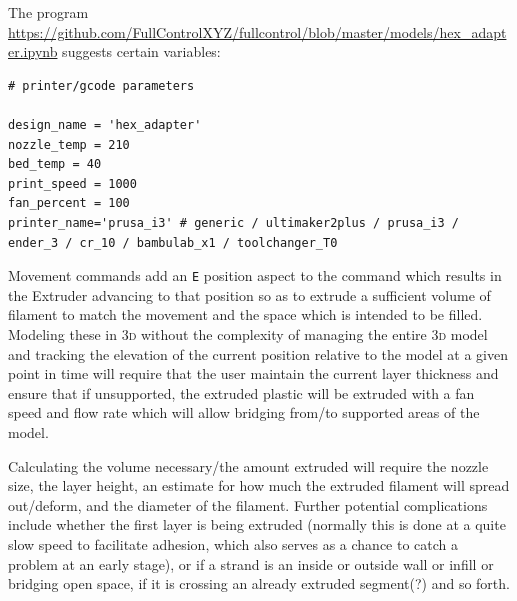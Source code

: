 \documentclass{ltxdoc}
\begin{document}
The program \url{https://github.com/FullControlXYZ/fullcontrol/blob/master/models/hex_adapter.ipynb} suggests certain variables:

\begin{verbatim}
# printer/gcode parameters

design_name = 'hex_adapter'
nozzle_temp = 210
bed_temp = 40
print_speed = 1000
fan_percent = 100
printer_name='prusa_i3' # generic / ultimaker2plus / prusa_i3 / ender_3 / cr_10 / bambulab_x1 / toolchanger_T0
\end{verbatim}

Movement commands add an \verb|E| position aspect to the command which results in the Extruder advancing to that position so as to extrude a sufficient volume of filament to match the movement and the space which is intended to be filled. Modeling these in \textsc{3d} without the complexity of managing the entire \textsc{3d} model and tracking the elevation of the current position relative to the model at a given point in time will require that the user maintain the current layer thickness and ensure that if unsupported, the extruded plastic will be extruded with a fan speed and flow rate which will allow bridging from/to supported areas of the model.

Calculating the volume necessary/the amount extruded will require the nozzle size, the layer height, an estimate for how much the extruded filament will spread out/deform, and the diameter of the filament. Further potential complications include whether the first layer is being extruded (normally this is done at a quite slow speed to facilitate adhesion, which also serves as a chance to catch a problem at an early stage), or if a strand is an inside or outside wall or infill or bridging open space, if it is crossing an already extruded segment(?) and so forth.
\end{document}
